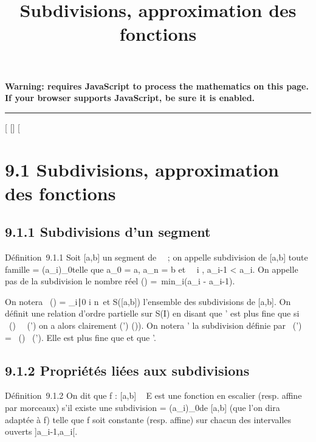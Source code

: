 \documentclass[]{article}
\title{Subdivisions, approximation des fonctions}
\author{}
\date{}
\begin{document}
\maketitle

\textbf{Warning: 
requires JavaScript to process the mathematics on this page.\\ If your
browser supports JavaScript, be sure it is enabled.}

\begin{center}\rule{3in}{0.4pt}\end{center}

[
[]
[

\section{9.1 Subdivisions, approximation des fonctions}

\subsection{9.1.1 Subdivisions d'un segment}

Définition~9.1.1 Soit [a,b] un segment de ~~; on appelle subdivision
de [a,b] toute famille \sigma = (a_i)_0\leqi\leqn telle que
a_0 = a, a_n = b et \forall~~i \in
[1,n], a_i-1 < a_i. On appelle pas de la
subdivision \sigma le nombre réel \delta(\sigma) =\
min_i\in[1,n](a_i - a_i-1).

On notera \mathrmPt~(\sigma) =
\a_i∣0 \leq i \leq
n\ et S([a,b]) l'ensemble des subdivisions de
[a,b]. On définit une relation d'ordre partielle sur S(I) en disant
que \sigma' est plus fine que \sigma si
\mathrmPt~(\sigma)
\subset~\mathrmPt~(\sigma') on a alors
clairement \delta(\sigma') \leq \delta(\sigma)). On notera \sigma \cup \sigma' la subdivision définie par
\mathrmPt~(\sigma \cup \sigma')
= \mathrmPt~(\sigma)
\cup\mathrmPt~(\sigma'). Elle est
plus fine que \sigma et que \sigma'.

\subsection{9.1.2 Propriétés liées aux subdivisions}

Définition~9.1.2 On dit que f : [a,b] \rightarrow~ E est une fonction en
escalier (resp. affine par morceaux) s'il existe une subdivision \sigma =
(a_i)_0\leqi\leqn de [a,b] (que l'on dira adaptée à f)
telle que f soit constante (resp. affine) sur chacun des intervalles
ouverts ]a_i-1,a_i[.
\end{document}
